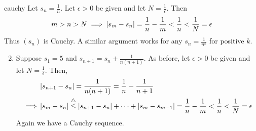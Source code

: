 \begin{examples}{}{cauchy}
	\exstart Let $s_n=\frac 1n$. Let $\epsilon>0$ be given and let $N=\frac 1\epsilon$. Then\footnotemark
	\[
		m>n>N\implies \left| s_m-s_n\right|=\frac 1n-\frac 1m<\frac 1n<\frac 1N=\epsilon
	\]
	Thus $(s_n)$ is Cauchy. A similar argument works for any $s_n=\frac 1{n^k}$ for positive $k$.
	  
	\begin{enumerate}\setcounter{enumi}{1}
	  \item\label{ex:cauchy3} Suppose $s_1=5$ and $s_{n+1}=s_n+\frac{1}{n(n+1)}$. As before, let $\epsilon>0$ be given and let $N=\frac 1\epsilon$. Then,
	  \begin{align*}
		  &\left| s_{n+1}-s_n\right|=\frac 1{n(n+1)}=\frac 1n-\frac 1{n+1}\\
		  \implies &\left| s_m-s_n\right|\overset{\triangle}{\le} \left| s_{n+1}-s_n\right|+\cdots+\left| s_m-s_{m-1}\right| = \frac 1n-\frac 1m<\frac 1n<\frac 1N=\epsilon
	  \end{align*}
	  Again we have a Cauchy sequence.
	  
	  \goodbreak
	  

\end{enumerate}
\end{examples}
